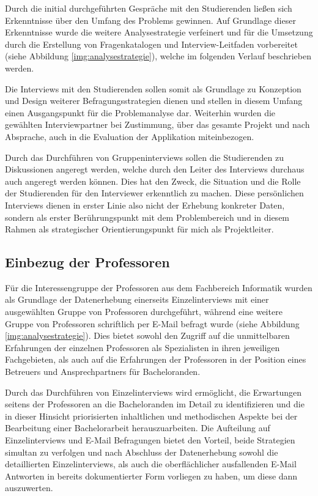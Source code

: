 \documentclass[bibliography=totoc,listof=totoc,BCOR=5mm,DIV=12,oneside]{scrbook}
\begin{document}
\par Durch die initial durchgeführten Gespräche mit den Studierenden ließen sich Erkenntnisse über den Umfang des Problems gewinnen. Auf Grundlage dieser Erkenntnisse wurde die weitere Analysestrategie verfeinert und für die Umsetzung durch die Erstellung von Fragenkatalogen und Interview-Leitfaden vorbereitet (siehe Abbildung \ref{img:analysestrategie}), welche im folgenden Verlauf beschrieben werden.
\par Die Interviews mit den Studierenden sollen somit als Grundlage zu Konzeption und Design weiterer Befragungsstrategien dienen und stellen in diesem Umfang einen Ausgangspunkt für die Problemanalyse dar. Weiterhin wurden die gewählten Interviewpartner bei Zustimmung, über das gesamte Projekt und nach Absprache, auch in die Evaluation der Applikation miteinbezogen.
\par\medskip Durch das Durchführen von Gruppeninterviews sollen die Studierenden zu Diskussionen angeregt werden, welche durch den Leiter des Interviews durchaus auch angeregt werden können. Dies hat den Zweck, die Situation und die Rolle der Studierenden für den Interviewer erkenntlich zu machen.  Diese persönlichen Interviews dienen in erster Linie also nicht der Erhebung konkreter Daten, sondern als erster Berührungspunkt mit dem Problembereich und in diesem Rahmen als strategischer Orientierungspunkt für mich als Projektleiter.

\subsection{Einbezug der Professoren}
\par Für die Interessengruppe der Professoren aus dem Fachbereich Informatik wurden als Grundlage der Datenerhebung einerseits Einzelinterviews mit einer ausgewählten Gruppe von Professoren durchgeführt, während eine weitere Gruppe von Professoren schriftlich per E-Mail befragt wurde (siehe Abbildung \ref{img:analysestrategie}). Dies bietet sowohl den Zugriff auf die unmittelbaren Erfahrungen der einzelnen Professoren als Spezialisten in ihren jeweiligen Fachgebieten, als auch auf die Erfahrungen der Professoren in der Position eines Betreuers und Ansprechpartners für Bacheloranden. 
\par Durch das Durchführen von Einzelinterviews wird ermöglicht, die Erwartungen seitens der Professoren an die Bacheloranden im Detail zu identifizieren und die in dieser Hinsicht priorisierten inhaltlichen und methodischen Aspekte bei der Bearbeitung einer Bachelorarbeit herauszuarbeiten. Die Aufteilung auf Einzelinterviews und E-Mail Befragungen bietet den Vorteil, beide Strategien simultan zu verfolgen und nach Abschluss der Datenerhebung sowohl die detaillierten Einzelinterviews, als auch die oberflächlicher ausfallenden E-Mail Antworten in bereits dokumentierter Form vorliegen zu haben, um diese dann auszuwerten.
\end{document}
